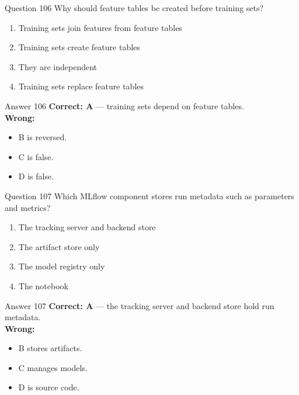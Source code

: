 \documentclass[aspectratio=169,11pt]{beamer}
\begin{document}
	\begin{frame}{Question 106}
		Why should feature tables be created before training sets?
		\begin{enumerate}[label=\Alph*.]
			\item Training sets join features from feature tables
			\item Training sets create feature tables
			\item They are independent
			\item Training sets replace feature tables
		\end{enumerate}
	\end{frame}
	\begin{frame}{Answer 106}
		\textbf{Correct: A} --- training sets depend on feature tables.\\
		\vspace{0.5em}
		\textbf{Wrong:}
		\begin{itemize}
			\item B is reversed.
			\item C is false.
			\item D is false.
		\end{itemize}
	\end{frame}
	
	\begin{frame}{Question 107}
		Which MLflow component stores run metadata such as parameters and metrics?
		\begin{enumerate}[label=\Alph*.]
			\item The tracking server and backend store
			\item The artifact store only
			\item The model registry only
			\item The notebook
		\end{enumerate}
	\end{frame}
	\begin{frame}{Answer 107}
		\textbf{Correct: A} --- the tracking server and backend store hold run metadata.\\
		\vspace{0.5em}
		\textbf{Wrong:}
		\begin{itemize}
			\item B stores artifacts.
			\item C manages models.
			\item D is source code.
		\end{itemize}
	\end{frame}
	
\end{document}
